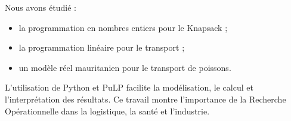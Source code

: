 \documentclass[12pt,a4paper]{article}
\begin{document}
Nous avons étudié :
\begin{itemize}
  \item la programmation en nombres entiers pour le Knapsack ;
  \item la programmation linéaire pour le transport ;
  \item un modèle réel mauritanien pour le transport de poissons.
\end{itemize}

L'utilisation de Python et PuLP facilite la modélisation, le
calcul et l'interprétation des résultats. Ce travail montre
l'importance de la Recherche Opérationnelle dans la logistique,
la santé et l'industrie.
\end{document}
